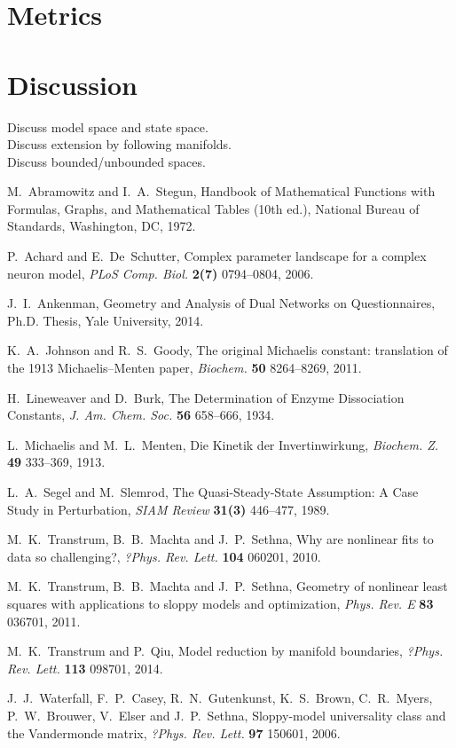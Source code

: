 \documentclass{article}
\begin{document}
\section{Metrics}


\section{Discussion}

Discuss model space and state space.\\

Discuss extension by following manifolds.\\

Discuss bounded/unbounded spaces.\\


\begin{thebibliography}{99}
%

M.~Abramowitz and I.~A.~Stegun,
Handbook of Mathematical Functions
with Formulas, Graphs, and Mathematical Tables (10th ed.),
National Bureau of Standards, Washington, DC, 1972.

P.~Achard and E.~De~Schutter,
Complex parameter landscape for a complex neuron model,
{\it PLoS Comp. Biol.} \textbf{2(7)} 0794--0804, 2006.

J.~I.~Ankenman,
Geometry and Analysis of Dual Networks on Questionnaires,
Ph.D. Thesis, Yale University, 2014.

K.~A.~Johnson and R.~S.~Goody,
The original Michaelis constant:
translation of the 1913 Michaelis--Menten paper,
{\it Biochem.} \textbf{50} 8264--8269, 2011.

H.~Lineweaver and D.~Burk,
The Determination of Enzyme Dissociation Constants,
{\it J. Am. Chem. Soc.} \textbf{56} 658--666, 1934.

L.~Michaelis and M.~L.~Menten,
Die Kinetik der Invertinwirkung,
{\it Biochem. Z.} \textbf{49} 333--369, 1913.

L.~A.~Segel and M.~Slemrod,
The Quasi-Steady-State Assumption:
A Case Study in Perturbation,
{\it SIAM Review} \textbf{31(3)} 446--477, 1989.

M.~K.~Transtrum, B.~B.~Machta and J.~P.~Sethna,
Why are nonlinear fits to data so challenging?,
{\it ?Phys. Rev. Lett.} \textbf{104} 060201, 2010.

M.~K.~Transtrum, B.~B.~Machta and J.~P.~Sethna,
Geometry of nonlinear least squares
with applications to sloppy models and optimization,
{\it Phys. Rev. E} \textbf{83} 036701, 2011.

M.~K.~Transtrum and P.~Qiu,
Model reduction by manifold boundaries,
{\it ?Phys. Rev. Lett.} \textbf{113} 098701, 2014.

J.~J.~Waterfall, F.~P.~Casey, R.~N.~Gutenkunst, K.~S.~Brown, C.~R.~Myers,
P.~W.~Brouwer, V.~Elser and J.~P.~Sethna,
Sloppy-model universality class and the Vandermonde matrix,
{\it ?Phys. Rev. Lett.} \textbf{97} 150601, 2006.

\end{thebibliography}
\end{document}
